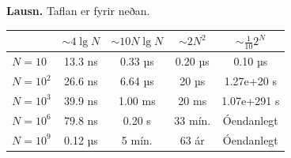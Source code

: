 \documentclass[a4paper, 12pt]{article}
\begin{document}
\medskip
\noindent
\textbf{Lausn.} Taflan er fyrir neðan. 

\begin{table}[ht!]
  \begin{tabular}{l|c|c|c|c}
    \toprule
                  & $\sim 4 \lg N$ & $\sim 10 N \lg N$ & $\sim 2N^2$ & $\sim \frac{1}{10} 2^N$ \\
    \midrule
    $N = 10$      & 13.3 ns        & 0.33 µs           & 0.20 µs         & 0.10 µs                 \\
    $N = 10^2$    & 26.6 ns        & 6.64 µs           & 20 µs           & 1.27e+20 s                 \\
    $N = 10^3$    & 39.9 ns        & 1.00 ms           & 20 ms           & 1.07e+291 s                       \\
    $N = 10^6$    & 79.8 ns        & 0.20 s            & 33 mín.         & Óendanlegt                        \\
    $N = 10^9$    & 0.12 µs        & 5 mín.            & 63 ár        & Óendanlegt                       \\
    \bottomrule
  \end{tabular}
\end{table}
\end{document}
